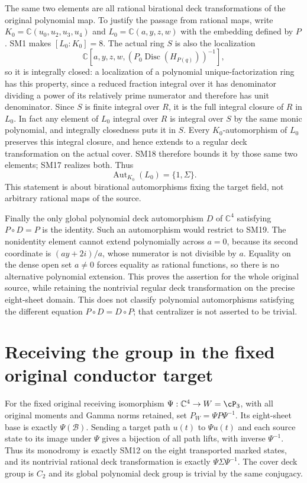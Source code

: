 \documentclass[11pt]{article}
\newcommand{\C}{\mathbb C}
\newcommand{\Disc}{\operatorname{Disc}}
\newcommand{\Aut}{\operatorname{Aut}}
\begin{document}
The same two elements are all rational birational deck
transformations of the original polynomial map. To justify the
passage from rational maps, write $K_0=\C(u_0,u_2,u_3,u_4)$
and $L_0=\C(a,y,z,w)$ with the embedding defined by $P$.
SM1 makes $[L_0:K_0]=8$. The actual ring $S$ is also the
localization
\[
 \C[a,y,z,w,(P_0\Disc(H_{P(q)}))^{-1}],
\]
so it is integrally closed: a localization of a polynomial
unique-factorization ring has this property, since a reduced
fraction integral over it has denominator dividing a power of
its relatively prime numerator and therefore has unit denominator.
Since $S$ is finite integral over $R$, it is the full integral
closure of $R$ in $L_0$. In fact any element of $L_0$ integral
over $R$ is integral over $S$ by the same monic polynomial,
and integrally closedness puts it in $S$.
Every $K_0$-automorphism of $L_0$ preserves this integral closure,
and hence extends to a regular deck transformation on the actual
cover. SM18 therefore bounds it by those same two elements;
SM17 realizes both. Thus
\begin{equation}
 \Aut_{K_0}(L_0)=\{1,\Sigma\}.\tag{SM19}
\end{equation}
This statement is about birational automorphisms fixing the
target field, not arbitrary rational maps of the source.

Finally the only global polynomial deck automorphism $D$ of $\C^4$
satisfying $P\circ D=P$ is the identity. Such an automorphism would
restrict to SM19. The nonidentity element cannot extend
polynomially across $a=0$, because its second coordinate is
$(ay+2i)/a$, whose numerator is not divisible by $a$.
Equality on the dense open set $a\ne0$ forces equality as
rational functions, so there is no alternative polynomial
extension. This proves the assertion for the whole original
source, while retaining the nontrivial regular deck
transformation on the precise eight-sheet domain. This does not
classify polynomial automorphisms satisfying the different equation
$P\circ D=D\circ P$; that centralizer is not asserted to be trivial.

\section{Receiving the group in the fixed original conductor target}
For the fixed original receiving isomorphism
$\Psi:\C^4\to W=\cP_3$, with all original moments and Gamma
norms retained, set $P_W=\Psi P\Psi^{-1}$. Its eight-sheet
base is exactly $\Psi(\mathcal B)$. Sending a target path
$u(t)$ to $\Psi u(t)$ and each source state to its image under
$\Psi$ gives a bijection of all path lifts, with inverse
$\Psi^{-1}$. Thus its monodromy is exactly SM12 on the eight
transported marked states, and its nontrivial rational deck
transformation is exactly $\Psi\Sigma\Psi^{-1}$. The cover
deck group is $C_2$ and its global polynomial deck group is
trivial by the same conjugacy.
\end{document}

